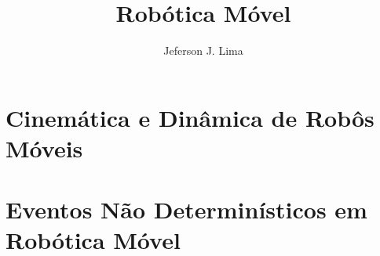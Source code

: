 \documentclass[krantz1,ChapterTOCs]{krantz}
\begin{document}
\frontmatter

\title{Robótica Móvel 
}
\author{Jeferson J. Lima}

\maketitle

%
\setcounter{page}{7} %
\tableofcontents
%
%
\listoffigures
\listoftables
%
%

\mainmatter


% 

\part{Cinemática e Dinâmica de Robôs Móveis}


% 

\part{Eventos Não Determinísticos em Robótica Móvel}






 

\end{document}
